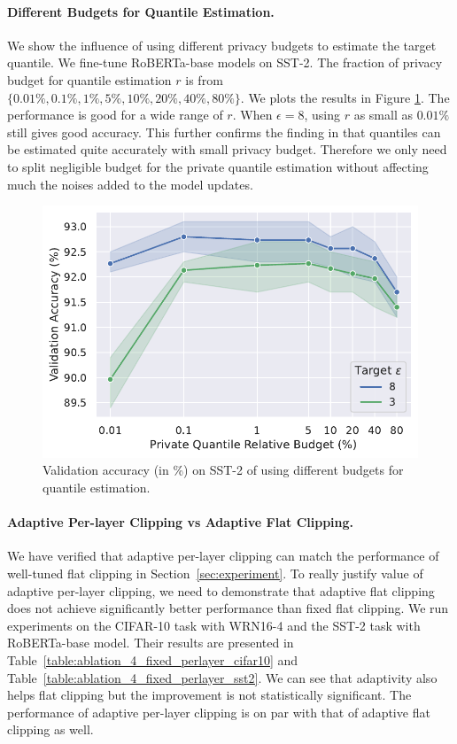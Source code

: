 \paragraph{Different Budgets for Quantile Estimation.}
We show the influence of using different privacy budgets to estimate the target quantile. We fine-tune RoBERTa-base models on SST-2. The fraction of privacy budget for quantile estimation $r$ is from $\{0.01\%, 0.1\%, 1\%, 5\%, 10\%, 20\%, 40\%, 80\%\}$. We plots the results in Figure \ref{fig:ablation-2-quantile-budget}. The performance is good for a wide range  of $r$. When $\epsilon=8$, using $r$ as small as $0.01\%$ still gives good accuracy. This further confirms the finding in \cite{andrew2019differentially} that quantiles can be estimated quite accurately with small privacy budget. Therefore we only need to split negligible budget for the private quantile estimation without affecting much the noises added to the model updates.

\begin{figure}[!t]
\centering
  \includegraphics[width=0.5\linewidth]{files/fig/ablation_2.pdf}
  \caption{Validation accuracy (in \%) on SST-2 of using different budgets for quantile estimation.}
  \label{fig:ablation-2-quantile-budget}
\end{figure}
 
\paragraph{Adaptive Per-layer Clipping vs Adaptive Flat Clipping.} 
We have verified that adaptive per-layer clipping can match the performance of well-tuned flat clipping in Section~\ref{sec:experiment}. To really justify value of adaptive per-layer clipping, we need to demonstrate that adaptive flat clipping does not achieve significantly better performance than fixed flat clipping. We run experiments on the CIFAR-10 task with WRN16-4 and the SST-2 task with RoBERTa-base model. Their results are presented in Table~\ref{table:ablation_4_fixed_perlayer_cifar10} and Table~\ref{table:ablation_4_fixed_perlayer_sst2}. We can see that adaptivity also helps flat clipping but the improvement is not statistically significant. The performance of adaptive per-layer clipping is on par with that of adaptive flat clipping as well.









